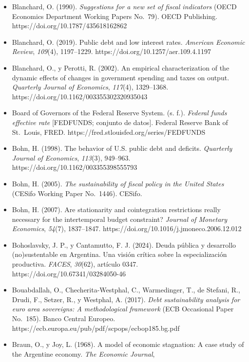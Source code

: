 \begin{itemize}[label={},leftmargin=1.27cm,itemindent=-1.27cm,itemsep=0.6\baselineskip]
  {[}M.R.B.AR; conjunto de datos{]}. https://data.bis.org/topics/EER
\item
  Blanchard, O. (1990). \emph{Suggestions for a new set of fiscal
  indicators} (OECD Economics Department Working Papers No.~79). OECD
  Publishing. https://doi.org/10.1787/435618162862
\item
  Blanchard, O. (2019). Public debt and low interest rates.
  \emph{American Economic Review}, \emph{109}(4), 1197--1229.
  https://doi.org/10.1257/aer.109.4.1197
\item
  Blanchard, O., y Perotti, R. (2002). An empirical characterization of
  the dynamic effects of changes in government spending and taxes on
  output. \emph{Quarterly Journal of Economics}, \emph{117}(4),
  1329--1368. https://doi.org/10.1162/003355302320935043
\item
  Board of Governors of the Federal Reserve System. (s. f.).
  \emph{Federal funds effective rate} {[}FEDFUNDS; conjunto de datos{]}.
  Federal Reserve Bank of St.~Louis, FRED.
  https://fred.stlouisfed.org/series/FEDFUNDS
\item
  Bohn, H. (1998). The behavior of U.S. public debt and deficits.
  \emph{Quarterly Journal of Economics}, \emph{113}(3), 949--963.
  https://doi.org/10.1162/003355398555793
\item
  Bohn, H. (2005). \emph{The sustainability of fiscal policy in the
  United States} (CESifo Working Paper No.~1446). CESifo.
\item
  Bohn, H. (2007). Are stationarity and cointegration restrictions
  really necessary for the intertemporal budget constraint?
  \emph{Journal of Monetary Economics}, \emph{54}(7), 1837--1847.
  https://doi.org/10.1016/j.jmoneco.2006.12.012
\item
  Bohoslavsky, J. P., y Cantamutto, F. J. (2024). Deuda pública y
  desarrollo (no)sustentable en Argentina. Una visión crítica sobre la
  especialización productiva. \emph{FACES}, \emph{30}(62), artículo
  0347. https://doi.org/10.67341/03284050-46
\item
  Bouabdallah, O., Checherita-Westphal, C., Warmedinger, T., de Stefani,
  R., Drudi, F., Setzer, R., y Westphal, A. (2017). \emph{Debt
  sustainability analysis for euro area sovereigns: A methodological
  framework} (ECB Occasional Paper No.~185). Banco Central Europeo.
  https://ecb.europa.eu/pub/pdf/scpops/ecbop185.bg.pdf
\item
  Braun, O., y Joy, L. (1968). A model of economic stagnation: A case
  study of the Argentine economy. \emph{The Economic Journal},

\end{itemize}
